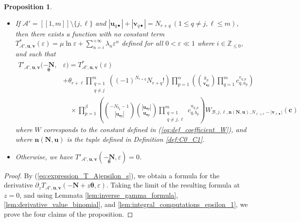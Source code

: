 \documentclass[a4paper]{amsart}
\newtheorem{proposition}[theorem]{Proposition}
\theoremstyle{remark}
\theoremstyle{definition}
\begin{document}
\begin{proposition}
\begin{itemize}
\item[iii)] If $\mathcal{A}'=[\![ 1,m ]\!] \setminus \{ j,\ell \}$ and $|\mathbf{u}_{q \bullet}|+|\mathbf{v}_{q \bullet}|=N_{r+q}\ (1 \leq q \neq j,\ell \leq m)$, then there exists a function with no constant term $T^*_{\mathcal{A}',\mathbf{u},\mathbf{v}}(\varepsilon)=\mu \ln \varepsilon +\sum_{n=i}^{+\infty} \lambda_n \varepsilon^n$ defined for all $0<\varepsilon \ll 1$ where $i \in \mathbb{Z}_{\leq 0}$, and such that
\begin{align}
     T'_{\mathcal{A}',\mathbf{u},\mathbf{v}}(\underset{\bm{\theta}}{-\mathbf{N}},&\varepsilon) = T^*_{\mathcal{A}',\mathbf{u},\mathbf{v}}(\varepsilon) \label{eq:expression_general_term_C_1_iii} \\
    & + \theta_{r+\ell} \prod_{\substack{q=1 \\ q \neq j}}^m \left( (-1)^{N_{r+q}} N_{r+q}!\right)\prod_{p=1}^{\alpha} \left( \binom{k_p}{\mathbf{v}_{\bullet p}} \prod_{q=1}^m c_{q,a_p}^{v_{q,p}} \right) \nonumber \\
    & \quad \times \prod_{p=1}^{\beta} \left( \binom{-N_{b_p}-1}{|\mathbf{u}_{\bullet p}|} \binom{|\mathbf{u}_{\bullet p}|}{\mathbf{u}_{\bullet p}} \prod_{\substack{q=1 \\ q \neq j,\ell}}^m c_{q,b_p}^{u_{q,p}} \right) W_{\mathcal{B},j,\ell,\mathbf{n}(\mathbf{N},\mathbf{u}),N_{\ell+r}-|\mathbf{v}_{\ell \bullet}|}(\mathbf{c}) \nonumber
\end{align}
where $W$ corresponds to the constant defined in (\ref{eq:def_coefficient_W}), and where $\mathbf{n}(\mathbf{N},\mathbf{u})$ is the tuple defined in Definition \ref{def:C0_C1}.

\item[iv)] Otherwise, we have $T'_{\mathcal{A}',\mathbf{u},\mathbf{v}}(\underset{\bm{\theta}}{-\mathbf{N}},\varepsilon)=0$.
\end{itemize}
\end{proposition}

\begin{proof}
By (\ref{eq:expression_T_Ajepsilon_s}), we obtain a formula for the derivative $\partial_z T_{\mathcal{A}',\mathbf{u},\mathbf{v}}(-\mathbf{N}+z\bm{\theta},\varepsilon)$. Taking the limit of the resulting formula at $z=0$, and using Lemmata \ref{lem:inverse_gamma_formula}, \ref{lem:derivative_value_binomial}, and \ref{lem:integral_computations_epsilon_1}, we prove the four claims of the proposition.
\end{proof}
\end{document}

